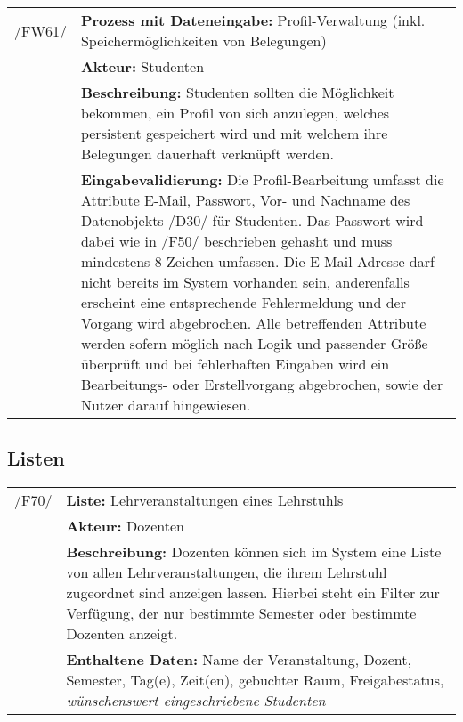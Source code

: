 \begin{tabular}{p{1.5cm}p{14.5cm}}
					
	 /FW61/& \textbf{Prozess mit Dateneingabe:} Profil-Verwaltung (inkl. Speichermöglichkeiten von Belegungen) \\
				& \textbf{Akteur:} Studenten \\
				& \textbf{Beschreibung:} Studenten sollten die Möglichkeit bekommen, ein Profil von sich anzulegen, welches persistent gespeichert wird und mit welchem ihre Belegungen dauerhaft verknüpft werden. \\
				& \textbf{Eingabevalidierung:} Die Profil-Bearbeitung umfasst die Attribute E-Mail, Passwort, Vor- und Nachname des Datenobjekts /D30/ für Studenten. Das Passwort wird dabei wie in /F50/ beschrieben gehasht und muss mindestens 8 Zeichen umfassen. Die E-Mail Adresse darf nicht bereits im System vorhanden sein, anderenfalls erscheint eine entsprechende Fehlermeldung und der Vorgang wird abgebrochen. Alle betreffenden Attribute werden sofern möglich nach Logik und passender Größe überprüft und bei fehlerhaften Eingaben wird ein Bearbeitungs- oder Erstellvorgang abgebrochen, sowie der Nutzer darauf hingewiesen.\\[0.25cm]

\end{tabular}


\subsection{Listen}


\begin{tabular}{p{1.5cm}p{14.5cm}}


	 /F70/	& \textbf{Liste:} Lehrveranstaltungen eines Lehrstuhls \\
				& \textbf{Akteur:} Dozenten \\
				& \textbf{Beschreibung:} Dozenten können sich im System eine Liste von allen Lehrveranstaltungen, die ihrem Lehrstuhl zugeordnet sind anzeigen lassen. Hierbei steht ein Filter zur Verfügung, der nur bestimmte Semester oder bestimmte Dozenten anzeigt. \\
				& \textbf{Enthaltene Daten:} Name der Veranstaltung, Dozent, Semester, Tag(e), Zeit(en), gebuchter Raum, Freigabestatus, \textsl{wünschenswert eingeschriebene Studenten} \\[0.25cm]

\end{tabular}


